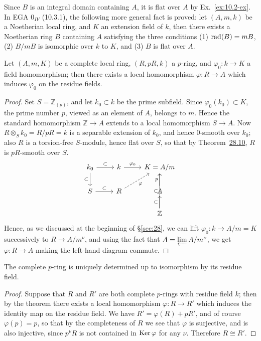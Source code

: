 \begin{remark}
Since $B$ is an integral domain containing $A$, it is flat over $A$ by
Ex.~\ref{ex:10.2-ex}. In EGA $0_{IV}$ (10.3.1), the following more general fact is proved:
let $(A, m, k)$ be a Noetherian local ring, and $K$ an extension field of $k$, then
there exists a Noetherian ring $B$ containing $A$ satisfying the three conditions
(1) $\operatorname{rad}(B) = mB$, (2) $B/mB$ is isomorphic over $k$ to $K$, and (3) $B$ is flat over $A$.
\end{remark}

\begin{theorem}\label{thm:29.2}
Let $(A, m, K)$ be a complete local ring, $(R, pR, k)$ a $p$-ring, and
$\varphi_0\colon k \to K$ a field homomorphism; then there exists a local homomorphism
$\varphi\colon R \to A$ which induces $\varphi_0$ on the residue fields.
\end{theorem}

\begin{proof}
Set $S = \mathbb{Z}_{(p)}$, and let $k_0 \subset k$ be the prime subfield. Since
$\varphi_0(k_0) \subset K$, the prime number $p$, viewed as an element of $A$, belongs to
$m$. Hence the standard homomorphism $\mathbb{Z} \to A$ extends to a local
homomorphism $S \to A$. Now $R \otimes_S k_0 = R/pR = k$ is a separable extension of
$k_0$, and hence 0-smooth over $k_0$; also $R$ is a torsion-free $S$-module, hence
flat over $S$, so that by Theorem~\hyperref[thm:28.10]{28.10}, $R$ is $pR$-smooth over $S$.
\[
\begin{tikzcd}
k_0 \arrow[r, "\subset"] \arrow[d, "\subset"'] & k \arrow[r, "\varphi_0"] & K = A/m \\
S \arrow[r, "\subset"] & R \arrow[ru, "\varphi"', dashed] & A \arrow[u, "p"] \\
& & \mathbb{Z} \arrow[u, "\subset"] \arrow[uu, "\subset"]
\end{tikzcd}
\]
Hence, as we discussed at the beginning of \S\ref{sec:28}, we can lift
$\varphi_0\colon k \to A/m = K$ successively to $R \to A/m^\nu$, and using the fact that
$A = \varprojlim A/m^\nu$, we get $\varphi\colon R \to A$ making the left-hand diagram
commute.
\end{proof}

\begin{theorem}\label{thm:29.3}
The complete $p$-ring is uniquely determined up to isomorphism by its residue
field.
\end{theorem}

\begin{proof}
Suppose that $R$ and $R'$ are both complete $p$-rings with residue field $k$; then by
the theorem there exists a local homomorphism $\varphi\colon R \to R'$ which induces
the identity map on the residue field. We have $R' = \varphi(R) + pR'$, and of course
$\varphi(p) = p$, so that by the completeness of $R$ we see that $\varphi$ is
surjective, and is also injective, since $p^\nu R$ is not contained in $\operatorname{Ker} \varphi$
for any $\nu$. Therefore $R \cong R'$.
\end{proof}

